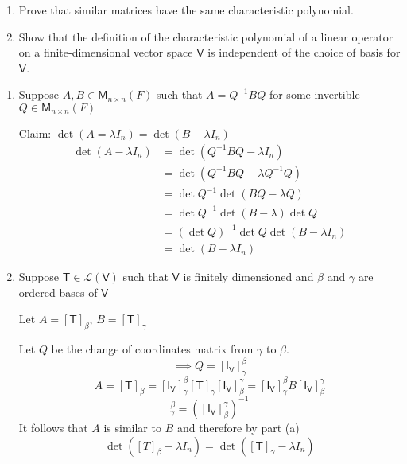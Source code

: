 \begin{enumerate}
\item Prove that similar matrices have the same characteristic
  polynomial.
\item Show that the definition of the characteristic polynomial of a
  linear operator on a finite-dimensional vector space $\mathsf{V}$ is
  independent of the choice of basis for $\mathsf{V}$.
\end{enumerate}
\begin{enumerate}
\item
Suppose $A,B \in \mathsf{M}_{n\times n}(F)$ such that $A=Q^{-1}BQ$ for
some invertible $Q \in \mathsf{M}_{n\times n}(F)$

Claim: $\det{(A=\lambda I_n)} = \det{(B-\lambda I_n)}$
\begin{align}
\det{(A -\lambda I_n)} &= \det{(Q^{-1}BQ - \lambda I_n)}\\
&=\det{(Q^{-1}BQ -\lambda Q^{-1}Q)}\\
&=\det{Q^{-1}}\det{(BQ -\lambda Q)}\\
&=\det{Q^{-1}}\det{(B -\lambda )}\det{Q}\\
&=(\det{Q})^{-1}\det{Q}\det{(B-\lambda I_n)}\\
&=\det{(B-\lambda I_n)}
\end{align}
\item Suppose $ \mathsf{T} \in \mathcal{L}(\mathsf{V})$ such that
  $\mathsf{V}$ is finitely dimensioned and $\beta$ and $\gamma$ are
  ordered bases of $\mathsf{V}$ 

Let $A = [\mathsf{T}]_\beta$, $B =[\mathsf{T}]_\gamma$ 

Let $Q$ be the change of coordinates matrix from $\gamma$ to $\beta$.
\begin{equation}
\implies Q = [\mathsf{I}_\mathsf{V}]_\gamma^\beta
\end{equation}
\begin{equation}
A = [\mathsf{T}]_\beta =
[\mathsf{I}_\mathsf{V}]_\gamma^\beta[\mathsf{T}]_\gamma[\mathsf{I}_\mathsf{V}]_\beta^\gamma
= [\mathsf{I}_\mathsf{V}]_\gamma^\beta B[\mathsf{I}_\mathsf{V}]_\beta^\gamma
\end{equation}
\begin{equation}
[\mathsf{I}_\mathsf{V}]_\gamma^\beta = ([\mathsf{I}_\mathsf{V}]^\gamma_\beta)^{-1}
\end{equation}
It follows that $A$ is similar to $B$ and therefore by part (a)
\begin{equation}
\det{([T]_\beta-\lambda I_n)} = \det{([\mathsf{T}]_\gamma - \lambda I_n)}
\end{equation}
\end{enumerate}
